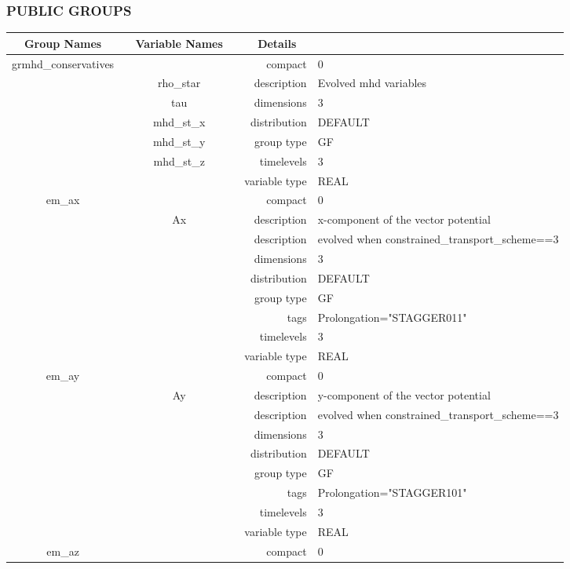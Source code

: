 \documentclass{article}
\begin{document}
\vspace{5mm}\subsubsection{PUBLIC GROUPS}

\vspace{5mm}

\begin{tabular*}{150mm}{|c|c@{\extracolsep{\fill}}|rl|} \hline 
~ {\bf Group Names} ~ & ~ {\bf Variable Names} ~  &{\bf Details} ~ & ~\\ 
\hline 
grmhd\_conservatives &  & compact & 0 \\ 
 & rho\_star & description & Evolved mhd variables \\ 
 & tau & dimensions & 3 \\ 
 & mhd\_st\_x & distribution & DEFAULT \\ 
 & mhd\_st\_y & group type & GF \\ 
 & mhd\_st\_z & timelevels & 3 \\ 
 &  & variable type & REAL \\ 
\hline 
em\_ax &  & compact & 0 \\ 
 & Ax & description & x-component of the vector potential \\ 
& ~ & description &  evolved when constrained\_transport\_scheme==3 \\ 
 &  & dimensions & 3 \\ 
 &  & distribution & DEFAULT \\ 
 &  & group type & GF \\ 
 &  & tags & Prolongation="STAGGER011" \\ 
 &  & timelevels & 3 \\ 
 &  & variable type & REAL \\ 
\hline 
em\_ay &  & compact & 0 \\ 
 & Ay & description & y-component of the vector potential \\ 
& ~ & description &  evolved when constrained\_transport\_scheme==3 \\ 
 &  & dimensions & 3 \\ 
 &  & distribution & DEFAULT \\ 
 &  & group type & GF \\ 
 &  & tags & Prolongation="STAGGER101" \\ 
 &  & timelevels & 3 \\ 
 &  & variable type & REAL \\ 
\hline 
em\_az &  & compact & 0 \\ 

\end{tabular*}
\end{document}
